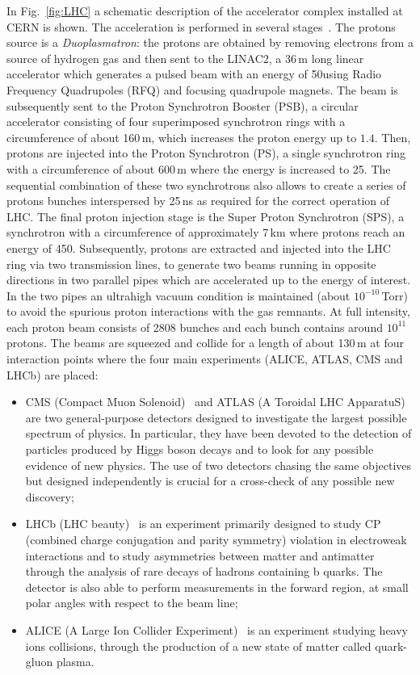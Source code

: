 In Fig.~\ref{fig:LHC} a schematic description of the accelerator complex installed at CERN is shown.
The acceleration is performed in several stages~\cite{Benedikt:823808}. The protons source is a \emph{Duoplasmatron}: the protons are obtained by removing electrons from a source of hydrogen gas and then sent to the LINAC2, a 36\,m long linear accelerator which generates a pulsed beam with an energy of 50\MeV using Radio Frequency Quadrupoles (RFQ) and focusing quadrupole magnets. The beam is subsequently sent to the Proton Synchrotron Booster (PSB), a circular accelerator consisting of four superimposed synchrotron rings with a circumference of about 160\,m, which increases the proton energy up to $1.4$\GeV. Then, protons are injected into the Proton Synchrotron (PS), a single synchrotron ring with a circumference of about 600\,m where the energy is increased to 25\GeV. The sequential combination of these two synchrotrons also allows to create a series of protons bunches
interspersed by 25\,ns as required for the correct operation of LHC. The final proton injection stage is the Super Proton Synchrotron (SPS), a synchrotron with a circumference of approximately 7\,km where protons reach an energy of 450\GeV. Subsequently, protons are extracted and injected into the LHC ring via two transmission lines, to generate two beams running in opposite directions in two parallel pipes which are accelerated up to the energy of interest. In the two pipes an ultrahigh vacuum condition is maintained (about $10^{-10}$\,Torr) to avoid the spurious proton interactions with the gas remnants. At full intensity, each proton beam consists of 2808 bunches and each bunch contains around $10^{11}$ protons. The beams are squeezed and collide for a length of about 130\,m at four interaction points where the four main experiments (ALICE, ATLAS, CMS and LHCb) are placed:
\begin{itemize}
\item CMS (Compact Muon Solenoid)~\cite{Chatrchyan:2008aa} and ATLAS (A Toroidal LHC ApparatuS)~\cite{Aad:2008zzm} are two general-purpose detectors designed to investigate the largest possible spectrum of physics. In particular, they have been devoted to the detection of particles produced by Higgs boson decays and to look for any possible evidence of new physics. The use of two detectors chasing the same objectives but designed independently is crucial for a cross-check of any possible new discovery;
\item LHCb (LHC beauty)~\cite{Alves:2008zz} is an experiment primarily designed to study CP (combined charge conjugation and parity symmetry) violation in electroweak interactions and to study asymmetries between matter and antimatter through the analysis of rare decays of hadrons containing b quarks. The detector is also able to perform measurements in the forward region, at small polar angles with respect to the beam line;
\item ALICE (A Large Ion Collider Experiment)~\cite{Aamodt:2008zz} is an experiment studying heavy ions collisions, through the production of a new state of matter called quark-gluon plasma.
\end{itemize}

